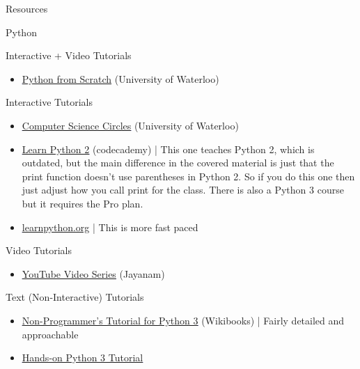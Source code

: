 \documentclass[11pt]{resume}
\begin{document}
\begin{section}{Resources}
\begin{subsection}{Python}
\begin{subsubsection}{Interactive + Video Tutorials}
\begin{itemize}
\item \textcolor{blue}{\underline{\href{https://open.cs.uwaterloo.ca/python-from-scratch/}{Python from Scratch}}}
(University of Waterloo)
\end{itemize}
\end{subsubsection}
\begin{subsubsection}{Interactive Tutorials}
\begin{itemize}
\item \textcolor{blue}{\underline{\href{https://cscircles.cemc.uwaterloo.ca/}{Computer Science Circles}}}
(University of Waterloo)
\item \textcolor{blue}{\underline{\href{https://www.codecademy.com/learn/learn-python}{Learn Python 2}}}
(codecademy)
|
This one teaches Python 2, which is outdated, but the main difference in the covered material
is just that the print function doesn't use parentheses in Python 2. So if you do this one then 
just adjust how you call print for the class. There is also a Python 3 course but it requires the Pro plan.
\item \textcolor{blue}{\underline{\href{https://www.learnpython.org/}{learnpython.org}}}
|
This is more fast paced
\end{itemize}
\end{subsubsection}
\begin{subsubsection}{Video Tutorials}
\begin{itemize}
\item \textcolor{blue}{\underline{\href{https://www.youtube.com/watch?v=9DVK2Khx8Ys\&list=PLboXykqtm8dy\_DNg1NZiS08Dnyj35PWXw\&index=4}{YouTube Video Series}}}
(Jayanam)
\end{itemize}
\end{subsubsection}
\begin{subsubsection}{Text (Non-Interactive) Tutorials}
\begin{itemize}
\item \textcolor{blue}{\underline{\href{https://en.wikibooks.org/wiki/Non-Programmer\%27s\_Tutorial\_for\_Python\_3}{Non-Programmer's Tutorial for Python 3}}}
(Wikibooks)
|
Fairly detailed and approachable
\item \textcolor{blue}{\underline{\href{http://anh.cs.luc.edu//python/hands-on/3.1/handsonHtml/index.html}{Hands-on Python 3 Tutorial}}}

\end{itemize}
\end{subsubsection}
\end{subsection}
\end{section}
\end{document}
